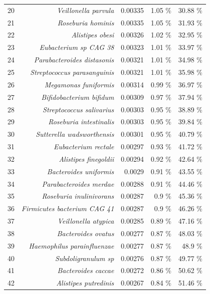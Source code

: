 \documentclass{article}
\begin{document}
\begin{table}[h]
\begin{centering}
\begin{tabular}{|r|r|r|r|r|}
      20 & \textit{Veillonella parvula} & 0.00335 & 1.05 \% & 30.88 \% \\
      21 & \textit{Roseburia hominis} & 0.00335 & 1.05 \% & 31.93 \% \\
      22 & \textit{Alistipes obesi} & 0.00326 & 1.02 \% & 32.95 \% \\
      23 & \textit{Eubacterium sp CAG 38} & 0.00323 & 1.01 \% & 33.97 \% \\
      24 & \textit{Parabacteroides distasonis} & 0.00321 & 1.01 \% & 34.98 \% \\
      25 & \textit{Streptococcus parasanguinis} & 0.00321 & 1.01 \% & 35.98 \% \\
      26 & \textit{Megamonas funiformis} & 0.00314 & 0.99 \% & 36.97 \% \\
      27 & \textit{Bifidobacterium bifidum} & 0.00309 & 0.97 \% & 37.94 \% \\
      28 & \textit{Streptococcus salivarius} & 0.00303 & 0.95 \% & 38.89 \% \\
      29 & \textit{Roseburia intestinalis} & 0.00303 & 0.95 \% & 39.84 \% \\
      30 & \textit{Sutterella wadsworthensis} & 0.00301 & 0.95 \% & 40.79 \% \\
      31 & \textit{Eubacterium rectale} & 0.00297 & 0.93 \% & 41.72 \% \\
      32 & \textit{Alistipes finegoldii} & 0.00294 & 0.92 \% & 42.64 \% \\
      33 & \textit{Bacteroides uniformis} & 0.0029 & 0.91 \% & 43.55 \% \\
      34 & \textit{Parabacteroides merdae} & 0.00288 & 0.91 \% & 44.46 \% \\
      35 & \textit{Roseburia inulinivorans} & 0.00287 & 0.9 \% & 45.36 \% \\
      36 & \textit{Firmicutes bacterium CAG 41} & 0.00287 & 0.9 \% & 46.26 \% \\
      37 & \textit{Veillonella atypica} & 0.00285 & 0.89 \% & 47.16 \% \\
      38 & \textit{Bacteroides ovatus} & 0.00277 & 0.87 \% & 48.03 \% \\
      39 & \textit{Haemophilus parainfluenzae} & 0.00277 & 0.87 \% & 48.9 \% \\
      40 & \textit{Subdoligranulum sp} & 0.00276 & 0.87 \% & 49.77 \% \\
      41 & \textit{Bacteroides caccae} & 0.00272 & 0.86 \% & 50.62 \% \\
      42 & \textit{Alistipes putredinis} & 0.00267 & 0.84 \% & 51.46 \% \\

\end{tabular}
\end{centering}
\end{table}
\end{document}
